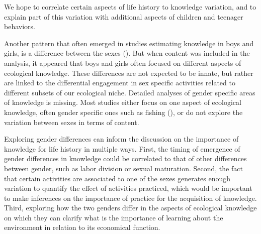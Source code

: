 


We hope to correlate certain aspects of life history to knowledge variation, and to explain part of this variation with additional aspects of children and teenager behaviors.


Another pattern that often emerged in studies estimating knowledge in boys and girls, is a difference between the sexes (\cite{Blacutt-Rivero2016LocalBolivia}). But when content was included in the analysis, it appeared that boys and girls often focused on different aspects of ecological knowledge. 
These differences are not expected to be innate, but rather are linked to the differential engagement in sex specific activities related to different subsets of our ecological niche. 
Detailed analyses of gender specific areas of knowledge is missing. Most studies either focus on one aspect of ecological knowledge, often gender specific ones such as fishing (\cite{Koster2016WisdomElders}), or do not explore the variation between sexes in terms of content. 

Exploring gender differences can inform the discussion on the importance of knowledge for life history in multiple ways. First, the timing of emergence of gender differences in knowledge could be correlated to that of other differences between gender, such as labor division or sexual maturation.
Second, the fact that certain activities are associated to one of the sexes generates enough variation to quantify the effect of activities practiced, which would be important to make inferences on the importance of practice for the acquisition of knowledge.
Third, exploring how the two genders differ in the aspects of ecological knowledge on which they can clarify what is the importance of learning about the environment in relation to its economical function. 



